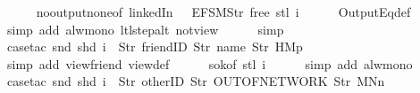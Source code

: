 \begin{isabellebody}
\ \ \ \ \isamarkupfalse%
\ no{\isacharunderscore}output{\isacharunderscore}none{\isacharbrackleft}of\ linkedIn\ {\isachardoublequoteopen}{\isacharparenleft}{\isacharless}{\isachargreater}{\isacharparenleft}{}\ {\isacharcolon}{\isacharequal}\ EFSM{\isachardot}Str\ {\isacharprime}{\isacharprime}free{\isacharprime}{\isacharprime}{\isacharparenright}{\isacharparenright}{\isachardoublequoteclose}\ {\isachardoublequoteopen}{\isacharparenleft}stl\ i{\isacharparenright}{\isachardoublequoteclose}{\isacharbrackright}\isanewline
\ \ \ \ \isamarkupfalse%
\ OutputEq{\isacharunderscore}def\isanewline
\ \ \ \ \ \isamarkupfalse%
\ {\isacharparenleft}simp\ add{\isacharcolon}\ alw{\isacharunderscore}mono\ ltl{\isacharunderscore}step{\isacharunderscore}alt\ not{\isacharunderscore}view{\isacharunderscore}{}{\isacharparenright}\isanewline
\ \ \ \ \isamarkupfalse%
\ simp\isanewline
\ \ \ \ \isamarkupfalse%
\ {\isacharparenleft}case{\isacharunderscore}tac\ {\isachardoublequoteopen}{\isacharparenleft}snd\ {\isacharparenleft}shd\ i{\isacharparenright}{\isacharparenright}\ {\isacharequal}\ {\isacharbrackleft}Str\ {\isacharprime}{\isacharprime}friendID{\isacharprime}{\isacharprime}{\isacharcomma}\ Str\ {\isacharprime}{\isacharprime}name{\isacharprime}{\isacharprime}{\isacharcomma}\ Str\ {\isacharprime}{\isacharprime}HM{}p{\isacharprime}{\isacharprime}{\isacharbrackright}{\isachardoublequoteclose}{\isacharparenright}\isanewline
\ \ \ \ \ \isamarkupfalse%
\ {\isacharparenleft}simp\ add{\isacharcolon}\ view{\isacharunderscore}friend\ view{\isacharunderscore}def{\isacharparenright}\isanewline
\ \ \ \ \isamarkupfalse%
\ s{}{\isacharunderscore}ok{\isacharbrackleft}of\ {\isachardoublequoteopen}stl\ i{\isachardoublequoteclose}{\isacharbrackright}\isanewline
\ \ \ \ \isamarkupfalse%
\ {\isacharparenleft}simp\ add{\isacharcolon}\ alw{\isacharunderscore}mono{\isacharparenright}\isanewline
\ \ \ \ \isamarkupfalse%
\ {\isacharparenleft}case{\isacharunderscore}tac\ {\isachardoublequoteopen}{\isacharparenleft}snd\ {\isacharparenleft}shd\ i{\isacharparenright}{\isacharparenright}\ {\isacharequal}\ {\isacharbrackleft}Str\ {\isacharprime}{\isacharprime}otherID{\isacharprime}{\isacharprime}{\isacharcomma}\ Str\ {\isacharprime}{\isacharprime}OUT{\isacharunderscore}OF{\isacharunderscore}NETWORK{\isacharprime}{\isacharprime}{\isacharcomma}\ Str\ {\isacharprime}{\isacharprime}MNn{}{\isacharprime}{\isacharprime}{\isacharbrackright}{\isachardoublequoteclose}{\isacharparenright}\isanewline

\end{isabellebody}
